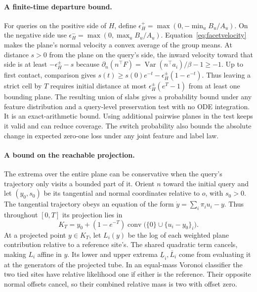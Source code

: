 \paragraph{A finite-time departure bound.}
For queries on the positive side of $H$, define
$\epsilon_H^+=\max(0,-\min_u B_u/A_u)$. On the negative side use
$\epsilon_H^-=\max(0,\max_u B_u/A_u)$. Equation~\eqref{eq:facetvelocity}
makes the plane's normal velocity a convex average of the group means.
At distance $s>0$ from the plane on the query's side, the inward
velocity toward that side is at least $-\epsilon_H^\pm-s$ because
$\partial_n(n^\top F)=\operatorname{Var}(n^\top a_i)/\beta-1\ge-1$.
Up to first contact, comparison gives
$s(t)\ge s(0)e^{-t}-\epsilon_H^\pm(1-e^{-t})$. Thus leaving a strict
cell by $T$ requires initial distance at most
$\epsilon_H^\pm(e^T-1)$ from at least one bounding plane.
The resulting union of slabs gives a probability bound under any
feature distribution and a query-level preservation test with no ODE
integration. It is an exact-arithmetic bound. Using additional
pairwise planes in the test keeps it valid and can reduce coverage.
The switch probability also bounds the absolute change in expected
zero-one loss under any joint feature and label law.

\paragraph{A bound on the reachable projection.}
The extrema over the entire plane can be conservative when the query's
trajectory only visits a bounded part of it. Orient $n$ toward the
initial query and let $(y_0,s_0)$ be its tangential and normal
coordinates relative to $o$, with $s_0>0$. The tangential trajectory
obeys an equation of the form $\dot y=\sum_i\pi_i u_i-y$. Thus throughout
$[0,T]$ its projection lies in
\begin{equation}
 K_T=y_0+(1-e^{-T})\operatorname{conv}
       \big(\{0\}\cup\{u_i-y_0\}_i\big).
 \label{eq:projected-tube}
\end{equation}
At a projected point $y\in K_T$, let $L_i(y)$ be the log of each
weighted plane contribution relative to a reference site's.
The shared quadratic term cancels, making $L_i$ affine in
$y$. Its lower and upper extrema $\underline L_i,\overline L_i$
come from evaluating it at the generators of the projected tube.
In an equal-mass Voronoi classifier the two tied sites have relative
likelihood one if either is the reference. Their opposite normal
offsets cancel, so their combined relative mass is two with offset
zero.

